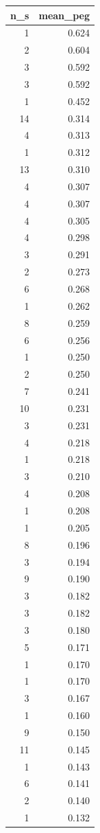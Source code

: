 \begin{tabular}{rr}
\toprule
n_s & mean_peg \\
\midrule
1 & 0.624 \\
2 & 0.604 \\
3 & 0.592 \\
3 & 0.592 \\
1 & 0.452 \\
14 & 0.314 \\
4 & 0.313 \\
1 & 0.312 \\
13 & 0.310 \\
4 & 0.307 \\
4 & 0.307 \\
4 & 0.305 \\
4 & 0.298 \\
3 & 0.291 \\
2 & 0.273 \\
6 & 0.268 \\
1 & 0.262 \\
8 & 0.259 \\
6 & 0.256 \\
1 & 0.250 \\
2 & 0.250 \\
7 & 0.241 \\
10 & 0.231 \\
3 & 0.231 \\
4 & 0.218 \\
1 & 0.218 \\
3 & 0.210 \\
4 & 0.208 \\
1 & 0.208 \\
1 & 0.205 \\
8 & 0.196 \\
3 & 0.194 \\
9 & 0.190 \\
3 & 0.182 \\
3 & 0.182 \\
3 & 0.180 \\
5 & 0.171 \\
1 & 0.170 \\
1 & 0.170 \\
3 & 0.167 \\
1 & 0.160 \\
9 & 0.150 \\
11 & 0.145 \\
1 & 0.143 \\
6 & 0.141 \\
2 & 0.140 \\
1 & 0.132 \\

\end{tabular}
